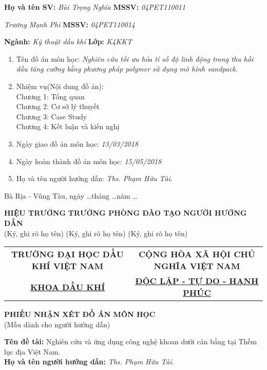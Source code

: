 \documentclass[12pt,a4paper]{article}
\begin{document}
\textbf{Họ và tên SV:} \textit{Bùi Trọng Nghĩa} \hspace{98pt} \textbf{MSSV:} \textit{04PET110011} 

\hspace{68pt} \textit{Trương Mạnh Phi} \hspace{95pt} \textbf{MSSV:} \textit{04PET110014}

\textbf{Ngành:} \textit{Kỹ thuật dầu khí} \hspace{130pt} \textbf{Lớp:} \textit{K4KKT}
\begin{enumerate}
	\item Tên đồ án môn học: \textit{Nghiên cứu tối ưu hóa tỉ số độ linh động trong thu hồi dầu tăng cường bằng phương pháp polymer sử dụng mô hình sandpack.}
	\item Nhiệm vụ(Nội dung đồ án):\\
	Chương 1: Tổng quan\\
	Chương 2: Cơ sở lý thuyết\\
	Chương 3: Case Study\\
	Chương 4: Kết luận và kiến nghị\\
	\item Ngày giao đồ án môn học: \textit{13/03/2018}
	\item Ngày hoàn thành đồ án môn học: \textit{15/05/2018}
	\item Họ và tên người hướng dẫn: \textit{Ths. Phạm Hữu Tài}.	
\end{enumerate}
\begin{flushright}
Bà Rịa - Vũng Tàu, ngày \ldots tháng \ldots năm \ldots
\end{flushright}
\textbf{HIỆU TRƯỞNG} \hspace{30pt} \textbf{TRƯỞNG PHÒNG ĐÀO TẠO} \hspace{30pt} \textbf{NGƯỜI HƯỚNG DẪN}\\
(Ký, ghi rõ họ tên) \hspace{60pt} (Ký, ghi rõ họ tên) \hspace{80pt} (Ký, ghi rõ họ tên)
\newpage
\begin{table}[h]
\centering
\label{my-label}
\begin{tabular}{cc}
 \textbf{TRƯỜNG ĐẠI HỌC DẦU KHÍ VIỆT NAM} & \textbf{CỘNG HÒA XÃ HỘI CHỦ NGHĨA VIỆT NAM} \\
 \underline{\textbf{KHOA DẦU KHÍ}}& \underline{\textbf{ĐỘC LẬP - TỰ DO - HẠNH PHÚC}}
\end{tabular}
\end{table}
\begin{center}
	\centering
	\textbf{PHIẾU NHẬN XÉT ĐỒ ÁN MÔN HỌC}\\
	(Mẫu dành cho người hướng dẫn)
\end{center}
\textbf{Tên đề tài:} Nghiên cứu và ứng dụng công nghệ khoan dưới cân bằng tại Thềm lục địa Việt Nam.\\
\textbf{Họ và tên người hướng dẫn:} \textit{Ths. Phạm Hữu Tài}.
\end{document}
